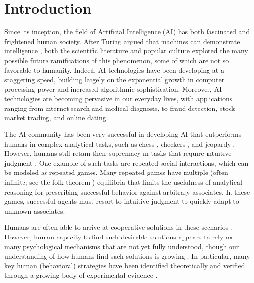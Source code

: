 \documentclass[fleqn,10pt]{SelfArx}
\affiliation{\textsuperscript{4}\textit{British University in Dubai, United Arab Emirates}}
\affiliation{\textsuperscript{5}\textit{School of Informatics, University of Edinburgh, Edinburgh, United Kingdom}}
\affiliation{\textsuperscript{*}\textbf{Corresponding author}: irahwan@acm.org}
\begin{document}
\flushbottom 

\maketitle 

\tableofcontents 

\thispagestyle{empty} 



\section{Introduction} 

Since its inception, the field of Artificial Intelligence (AI) has both fascinated and frightened
human society. After Turing argued that machines can demonstrate intelligence \cite{Turing:1950}, both the scientific literature and popular culture explored the many possible future ramifications of this phenomenon, some of which are not so favorable to humanity. Indeed, AI technologies have been developing at a staggering speed, building largely on the exponential growth in computer processing power \cite{moore:1965} and increased algorithmic sophistication. Moreover, AI technologies are becoming pervasive in our everyday lives, with applications ranging from internet search and medical diagnosis, to fraud detection, stock market trading, and online dating.

The AI community has been very successful in developing AI that outperforms humans in complex analytical tasks, such as chess \cite{Campbell:etal:2002}, checkers \cite{Schaeffer:etal:2007}, and jeopardy \cite{Ferrucci:etal:2010}.  However, humans still retain their supremacy in tasks that require intuitive judgment \cite{Kasparov:2010}.  One example of such tasks are repeated social interactions, which can be modeled as repeated games.  Many repeated games have multiple (often infinite; see the folk theorem \cite{GintisGameTheory}) equilibria that limits the usefulness of analytical reasoning for prescribing successful behavior against arbitrary associates.  In these games, successful agents must resort to intuitive judgment to quickly adapt to unknown associates.

Humans are often able to arrive at cooperative solutions in these scenarios \cite{PassionWithinReason,Rilling:etal:2002}. However, human capacity to find such desirable solutions appears to rely on many psychological mechanisms that are not yet fully understood, though our understanding of how humans find such solutions is growing \cite{fehr2004social,rand2013human}.  In particular, many key human (behavioral) strategies have been identified theoretically \cite{Nowak:2006} and verified through a growing body of experimental evidence \cite{Dal:2011,Fudenberg:etal:2012}.
\end{document}
